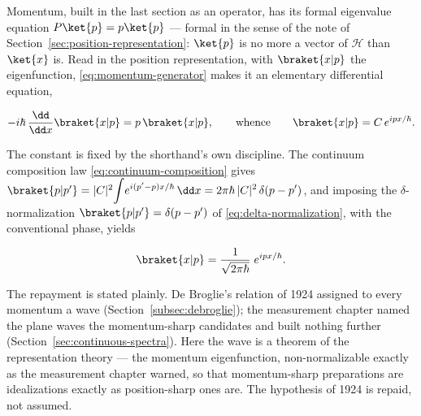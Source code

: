 Momentum, built in the last section as an operator, has its formal eigenvalue equation $P\ket{p} = p\ket{p}$ --- formal in the sense of the note of Section~\ref{sec:position-representation}: $\ket{p}$ is no more a vector of $\mathcal{H}$ than $\ket{x}$ is. Read in the position representation, with $\braket{x|p}$ the eigenfunction, \eqref{eq:momentum-generator} makes it an elementary differential equation,
\begin{linenomath}
    \begin{equation*}
        -i\hbar\,\frac{\dd}{\dd x}\braket{x|p} = p\,\braket{x|p},
        \qquad\text{whence}\qquad
        \braket{x|p} = C\,e^{ipx/\hbar} .
    \end{equation*}
\end{linenomath}
The constant is fixed by the shorthand's own discipline. The continuum composition law \eqref{eq:continuum-composition} gives $\braket{p|p'} = |C|^2\!\displaystyle\int\!e^{i(p'-p)x/\hbar}\,\dd x = 2\pi\hbar\,|C|^2\,\delta(p - p')$, and imposing the $\delta$-normalization $\braket{p|p'} = \delta(p - p')$ of \eqref{eq:delta-normalization}, with the conventional phase, yields
\begin{linenomath}
    \begin{equation}
        \braket{x|p} = \frac{1}{\sqrt{2\pi\hbar}}\;e^{ipx/\hbar} .
        \label{eq:debroglie-wave}
    \end{equation}
\end{linenomath}
The repayment is stated plainly. De Broglie's relation of 1924 assigned to every momentum a wave (Section~\ref{subsec:debroglie}); the measurement chapter named the plane waves the momentum-sharp candidates and built nothing further (Section~\ref{sec:continuous-spectra}). Here the wave is a theorem of the representation theory --- the momentum eigenfunction, non-normalizable exactly as the measurement chapter warned, so that momentum-sharp preparations are idealizations exactly as position-sharp ones are. The hypothesis of 1924 is repaid, not assumed.

